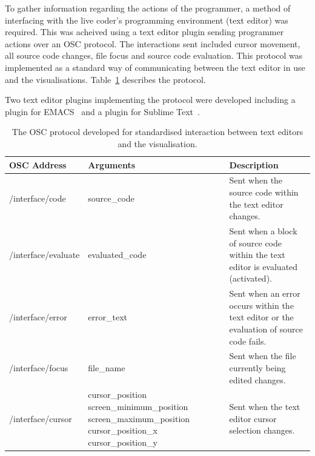 To gather information regarding the actions of the programmer, a method of interfacing with the live coder's programming environment (text editor) was required. This was acheived using a text editor plugin sending programmer actions over an \ac{OSC} protocol. The interactions sent included cursor movement, all source code changes, file focus and source code evaluation. This protocol was implemented as a standard way of communicating between the text editor in use and the visualisations. Table~\ref{table:osc-protocol} describes the protocol.

Two text editor plugins implementing the protocol were developed including a plugin for EMACS~\cite{Stallman1981} and a plugin for Sublime Text~\cite{Skinner2013}.

\begin{table}
  \centering
  \begin{tabular}{|l|p{4.75cm}|p{4.75cm}|}
  \hline
  \textbf{OSC Address} & \textbf{Arguments} & \textbf{Description}\\
  \hline
	/interface/code & source\_code & Sent when the source code within the text editor changes.\\
	\hline
	/interface/evaluate & evaluated\_code & Sent when a block of source code within the text editor is evaluated (activated). \\
	\hline
	/interface/error & error\_text & Sent when an error occurs within the text editor or the evaluation of source code fails.\\
	\hline
	/interface/focus & file\_name & Sent when the file currently being edited changes.\\
	\hline
	/interface/cursor & cursor\_position \newline screen\_minimum\_position \newline screen\_maximum\_position \newline cursor\_position\_x \newline cursor\_position\_y & Sent when the text editor cursor selection changes. \\
  \hline
  \end{tabular}
  \caption{The OSC protocol developed for standardised interaction between text editors and the visualisation.}
  \label{table:osc-protocol}
\end{table}


